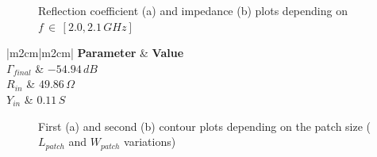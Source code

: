 \documentclass[10 pt,a4paper,twocolumn]{article}
\begin{document}
{%

\begin{figure}[bt!]
	\centering
	\begin{subfigure}[b]{0.42\linewidth}
		\def\svgwidth{\linewidth}
		\tiny{}
		\caption{}
	\end{subfigure}
\hspace{0.1\linewidth}
	\begin{subfigure}[b]{0.4\linewidth}
		\def\svgwidth{\linewidth}
		\tiny{}
		\caption{}
	\end{subfigure}
	\caption{Reflection coefficient (a) and impedance (b) plots depending on $f\,\in\,[2.0,2.1\,GHz]$}
	\label{fig:Gamma and Z previa wfeed}
\end{figure}


\begin{table}
	\begin{center}
		{\selectfont	\begin{tabular}{|m{2cm}|m{2cm}|}
				\hline
				\textbf{Parameter} & \textbf{Value}\\
				\hline
				$\Gamma_{final}$ & $-54.94\,dB$\\
				\hline
				$R_{in}$ & $49.86\,\Omega$ \\
				\hline
				$Y_{in}$ & $ 0.11\,S$ \\
				\hline
		\end{tabular}}
		\caption{Final $\Gamma$ and impedance matching values after last optimization choice: the $w_{feed}$ change}
		\label{table:Gamma and Z}
	\end{center}
\end{table}
\begin{figure}[bt!]
	\begin{subfigure}{0.48\linewidth}
		\def\svgwidth{\linewidth}
		\tiny{}
		\caption{}
		\label{fig:first contour}
	\end{subfigure}
	\hfill
	\begin{subfigure}{0.48\linewidth}
		\def\svgwidth{\linewidth}
		\tiny{}
		\caption{}
		\label{fig:second contour}
	\end{subfigure}
	\caption{First (a) and second (b) contour plots depending on the patch size ($L_{patch}$ and $W_{patch}$ variations)}
\end{figure}


}
\end{document}
